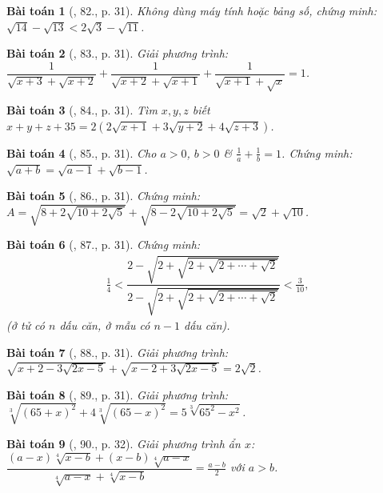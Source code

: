 \documentclass{article}
\newtheorem{baitoan}{Bài toán}
\begin{document}
\begin{baitoan}[\cite{Tuyen_Toan_9}, 82., p. 31]
	Không dùng máy tính hoặc bảng số, chứng minh: $\sqrt{14} - \sqrt{13} < 2\sqrt{3} - \sqrt{11}$.
\end{baitoan}

\begin{baitoan}[\cite{Tuyen_Toan_9}, 83., p. 31]
	Giải phương trình: $\dfrac{1}{\sqrt{x + 3} + \sqrt{x + 2}} + \dfrac{1}{\sqrt{x + 2} + \sqrt{x + 1}} + \dfrac{1}{\sqrt{x + 1} + \sqrt{x}} = 1$. 
\end{baitoan}

\begin{baitoan}[\cite{Tuyen_Toan_9}, 84., p. 31]
	Tìm $x,y,z$ biết $x + y + z + 35 = 2(2\sqrt{x + 1} + 3\sqrt{y + 2} +4\sqrt{z + 3})$.
\end{baitoan}

\begin{baitoan}[\cite{Tuyen_Toan_9}, 85., p. 31]
	Cho $a > 0$, $b > 0$ \& $\frac{1}{a} + \frac{1}{b} = 1$. Chứng minh: $\sqrt{a + b} = \sqrt{a - 1} + \sqrt{b - 1}$.
\end{baitoan}

\begin{baitoan}[\cite{Tuyen_Toan_9}, 86., p. 31]
	Chứng minh: $A = \sqrt{8 + 2\sqrt{10 + 2\sqrt{5}}} + \sqrt{8 - 2\sqrt{10 + 2\sqrt{5}}} = \sqrt{2} + \sqrt{10}$.
\end{baitoan}

\begin{baitoan}[\cite{Tuyen_Toan_9}, 87., p. 31]
	Chứng minh:
	\begin{align*}
		\frac{1}{4} < \dfrac{2 - \sqrt{2 + \sqrt{2 + \sqrt{2 + \cdots + \sqrt{2}}}}}{2 - \sqrt{2 + \sqrt{2 + \sqrt{2 + \cdots + \sqrt{2}}}}} < \frac{3}{10},
	\end{align*}
	(ở tử có $n$ dấu căn, ở mẫu có $n - 1$ dấu căn).
\end{baitoan}

\begin{baitoan}[\cite{Tuyen_Toan_9}, 88., p. 31]
	Giải phương trình: $\sqrt{x + 2 - 3\sqrt{2x - 5}} + \sqrt{x - 2 + 3\sqrt{2x - 5}} = 2\sqrt{2}$.
\end{baitoan}

\begin{baitoan}[\cite{Tuyen_Toan_9}, 89., p. 31]
	Giải phương trình: $\sqrt[3]{(65 + x)^2} + 4\sqrt[3]{(65 - x)^2} = 5\sqrt[3]{65^2 - x^2}$.
\end{baitoan}

\begin{baitoan}[\cite{Tuyen_Toan_9}, 90., p. 32]
	Giải phương trình ẩn $x$: $\dfrac{(a - x)\sqrt[4]{x - b} + (x - b)\sqrt[4]{a - x}}{\sqrt[4]{a - x} + \sqrt[4]{x - b}} = \frac{a - b}{2}$ với $a > b$.
\end{baitoan}
\end{document}
